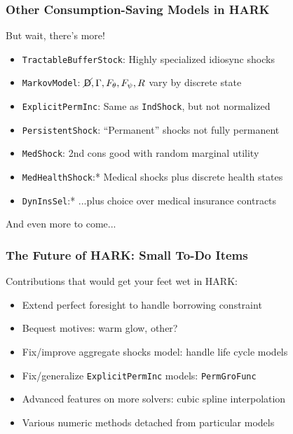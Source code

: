 \documentclass[11pt,handout]{beamer}
\newcommand{\bi}{\begin{itemize}}
\newcommand{\ei}{\end{itemize}}
\newcommand{\Die}{\mathsf{D}}
\newcommand{\Live}{\cancel{\Die}}
\begin{document}
\begin{frame}
\frametitle{Other Consumption-Saving Models in HARK}
But wait, there's more!
\begin{itemize}
\item <1->\texttt{TractableBufferStock}: Highly specialized idiosync shocks

\item <2->\texttt{MarkovModel}: $\Live,\Gamma,F_\theta,F_\psi,R$ vary by discrete state

\item <3->\texttt{ExplicitPermInc}: Same as \texttt{IndShock}, but not normalized

\item <3->\texttt{PersistentShock}: ``Permanent'' shocks not fully permanent

\item <4->\texttt{MedShock}: 2nd cons good with random marginal utility

\item <5->\texttt{MedHealthShock}:* Medical shocks plus discrete health states

\item <5->\texttt{DynInsSel}:* ...plus choice over medical insurance contracts
\end{itemize}
And even more to come...
\end{frame}


\begin{frame}
\frametitle{The Future of HARK: Small To-Do Items}
Contributions that would get your feet wet in HARK:
\bi
\item <1->Extend perfect foresight to handle borrowing constraint

\item <1->Bequest motives: warm glow, other?

\item <2->Fix/improve aggregate shocks model: handle life cycle models

\item <2->Fix/generalize \texttt{ExplicitPermInc} models: \texttt{PermGroFunc}

\item <3->Advanced features on more solvers: cubic spline interpolation

\item <3->Various numeric methods detached from particular models
\ei
\end{frame}
\end{document}
